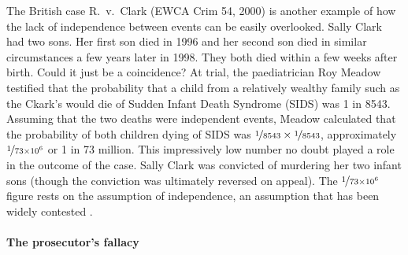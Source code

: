\documentclass{article}
\begin{document}
The British case  
R.\ v.\ Clark (EWCA Crim 54, 2000) 
is another example of how 
the lack of independence between events can be easily overlooked. %
Sally Clark had two sons. Her first son died in 1996 and her second son died in similar circumstances a few years later in 1998. They both died within a few weeks  after birth. Could it just be a coincidence? At trial,  the paediatrician Roy Meadow testified that the probability that a child from a relatively wealthy family such as the Ckark's would die of Sudden Infant Death Syndrome (SIDS) was 1 in 8543. Assuming that the two deaths were independent events, Meadow calculated that the probability of both children dying of SIDS was $\nicefrac{1}{8543}\times \nicefrac{1}{8543}$, approximately $\nicefrac{1}{73\times 10^6}$ or 1 in 73 million.
This impressively low number no doubt played a role in the outcome of the case. 
Sally Clark was convicted of murdering her two infant sons (though the conviction was ultimately reversed on appeal). 
The $\nicefrac{1}{73\times 10^6}$ figure rests on the assumption of independence, an  assumption that has been widely contested  \citep{Dawid02, sasardic207, Barker2017}.

\paragraph{The prosecutor's fallacy}
\end{document}
